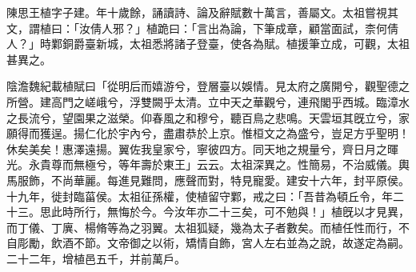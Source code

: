 
\begin{pinyinscope}
陳思王植字子建。年十歲餘，誦讀詩、論及辭賦數十萬言，善屬文。太祖嘗視其文，謂植曰：「汝倩人邪？」植跪曰：「言出為論，下筆成章，顧當面試，柰何倩人？」時鄴銅爵臺新城，太祖悉將諸子登臺，使各為賦。植援筆立成，可觀，太祖甚異之。

陰澹魏紀載植賦曰「從明后而嬉游兮，登層臺以娛情。見太府之廣開兮，觀聖德之所營。建高門之嵯峨兮，浮雙闕乎太清。立中天之華觀兮，連飛閣乎西城。臨漳水之長流兮，望園果之滋榮。仰春風之和穆兮，聽百鳥之悲鳴。天雲垣其旣立兮，家願得而獲逞。揚仁化於宇內兮，盡肅恭於上京。惟桓文之為盛兮，豈足方乎聖明！休矣美矣！惠澤遠揚。翼佐我皇家兮，寧彼四方。同天地之規量兮，齊日月之暉光。永貴尊而無極兮，等年壽於東王」云云。太祖深異之。性簡易，不治威儀。輿馬服飾，不尚華麗。每進見難問，應聲而對，特見寵愛。建安十六年，封平原侯。十九年，徙封臨菑侯。太祖征孫權，使植留守鄴，戒之曰：「吾昔為頓丘令，年二十三。思此時所行，無悔於今。今汝年亦二十三矣，可不勉與！」植旣以才見異，而丁儀、丁廙、楊脩等為之羽翼。太祖狐疑，幾為太子者數矣。而植任性而行，不自彫勵，飲酒不節。文帝御之以術，矯情自飾，宮人左右並為之說，故遂定為嗣。二十二年，增植邑五千，并前萬戶。


\end{pinyinscope}
